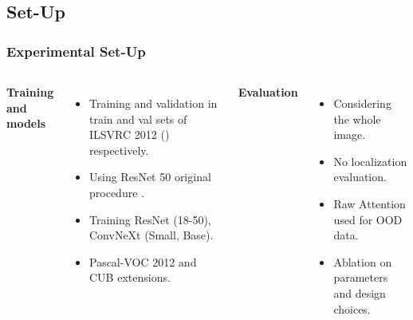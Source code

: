 \subsection*{Set-Up}
\begin{frame}[t]
    \frametitle{Experimental Set-Up}
    {\footnotesize
    \begin{columns}
        \textbf{Training and models}
            \begin{itemize}
                \item Training and validation in train and val sets of ILSVRC 2012 
                (\cite{krizhevsky2012imagenet, ILSVRC15}) respectively.
                \item Using ResNet 50 original procedure \cite{bottou2010large} \footnotemark.
                \item Training ResNet (18-50), ConvNeXt (Small, Base).
                \item Pascal-VOC 2012\cite{Everingham15} and CUB\cite{WahCUB_200_2011} extensions. 
                

            \end{itemize}\pause
        \textbf{Evaluation }
        \begin{itemize}
            \item Considering the whole image.%
            \item No localization evaluation.%
            \item Raw Attention used for OOD data.%
            \item Ablation on parameters and design choices.
        \end{itemize}
    \end{columns}
    }
\end{frame}